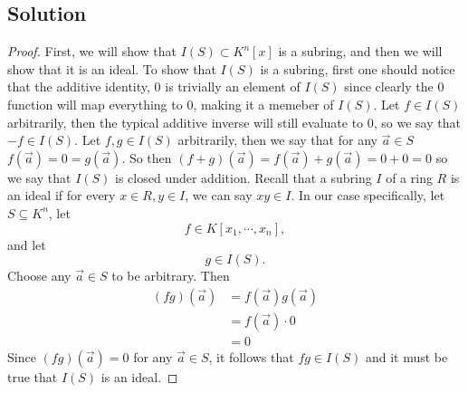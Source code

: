 \documentclass{article}
\theoremstyle{definition}
\begin{document}
\subsection*{Solution}
\begin{proof}
First, we will show that $I(S) \subset K^n[x]$ is a subring, 
and then we will show that it is an ideal. To show that $I(S)$ is 
a subring, first one should notice that the additive identity, $0$
is trivially an element of $I(S)$ since clearly the $0$ function 
will map everything to 0, making it a memeber of $I(S)$. 
Let $f \in I(S)$ arbitrarily, then the typical additive inverse will 
still evaluate to 0, so we say that $-f \in I(S)$.
Let $f,g \in I(S)$ arbitrarily, then we say that for any $\vec a \in S$
$f(\vec a) = 0 = g(\vec a)$. So then $(f + g)(\vec a) = f(\vec a) + g(\vec a) = 0 + 0 = 0$
so we say that $I(S)$ is closed under addition.
Recall that a subring $I$ of a ring $R$ is an ideal if for every $x \in R, y \in I$,
we can say $xy \in I$.
In our case specifically, let $S \subseteq K^n$, let
\[
    f \in K[x_1, \cdots, x_n]    
,\]
and let 
\[
    g \in I(S)
.\]
Choose any $\vec a \in S$ to be arbitrary. Then 
\begin{align*}
    (fg)(\vec a) &= f(\vec a)g(\vec a) \\
    &= f(\vec a) \cdot 0 \\
    &= 0
\end{align*}
Since $(fg)(\vec a) = 0$ for any $\vec a \in S$, it follows that $fg \in I(S)$
and it must be true that $I(S)$ is an ideal.
\end{proof}
\end{document}
